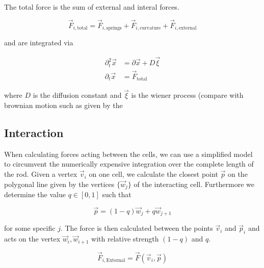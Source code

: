 \documentclass{article}
\begin{document}
The total force is the sum of external and interal forces.

\begin{equation}
    \vec{F}_{i,\text{total}} = \vec{F}_{i,\text{springs}}+ \vec{F}_{i,\text{curvature}} + \vec{F}_{i,\text{external}}
   \label{force-total}
\end{equation}

and are integrated via

\begin{align}
    \partial_t^2 \vec{x} &= \partial\vec{x} + D\vec{\xi}\\
    \partial_t\vec{x} &= \vec{F}_\text{total}
    \label{equations-of-motion}
\end{align}

where $D$ is the diffusion constant and  $\vec{\xi}$ is the wiener process (compare with
brownian motion such as given by the

\subsection{Interaction}

When calculating forces acting between the cells, we can use a simplified model to circumvent the
numerically expensive integration over the complete length of the rod.
Given a vertex $\vec{v}_i$ on one cell, we calculate the closest point $\vec{p}$ on the polygonal
line given by the vertices $\{\vec{w}_j\}$ of the interacting cell.
Furthermore we determine the value $q\in[0,1]$ such that

\begin{equation}
    \vec{p} = (1-q)\vec{w}_j + q\vec{w}_{j+1}
   \label{connection}
\end{equation}

for some specific $j$.
The force is then calculated between the points $\vec{v}_i$ and $\vec{p}_i$ and acts on
the vertex $\vec{w}_i,\vec{w}_{i+1}$ with relative strength $(1-q)$ and $q$.

\begin{equation}
    \vec{F}_{i,\text{External}} = \vec{F}(\vec{v}_i,\vec{p})
    \label{force-external}
\end{equation}

\end{document}
